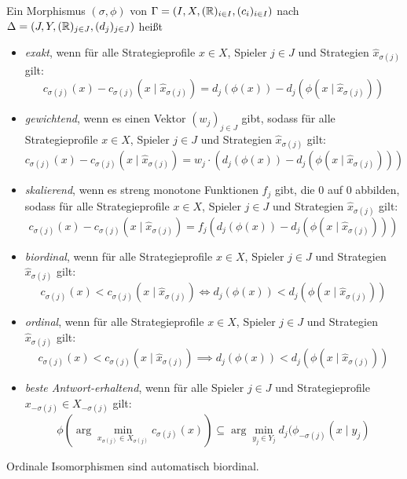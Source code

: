 
\begin{defn}
	Ein Morphismus $(\sigma, \phi)$ von $\Gamma = (I, X, (\mathbb{R})_{i\in I}, (c_i)_{i\in I})$ nach $\Delta = (J, Y, (\mathbb{R})_{j\in J}, (d_j)_{j\in J})$ heißt
	\begin{itemize}
		\item \emph{exakt}, wenn für alle Strategieprofile $x \in X$, Spieler $j \in J$ und Strategien $\hat{x}_{\sigma(j)}$ gilt:
		\[c_{\sigma(j)}(x) - c_{\sigma(j)}(x \mid \hat{x}_{\sigma(j)}) = d_j(\phi(x)) - d_j(\phi(x \mid \hat{x}_{\sigma(j)}))\]
		\item \emph{gewichtend}, wenn es einen Vektor $(w_j)_{j \in J}$ gibt, sodass für alle Strategieprofile $x \in X$, Spieler $j \in J$ und Strategien $\hat{x}_{\sigma(j)}$ gilt:
		\[c_{\sigma(j)}(x) - c_{\sigma(j)}(x \mid \hat{x}_{\sigma(j)}) = w_j\cdot\left(d_j(\phi(x)) - d_j(\phi(x \mid \hat{x}_{\sigma(j)}))\right)\]
		\item \emph{skalierend}, wenn es streng monotone Funktionen $f_j$ gibt, die $0$ auf $0$ abbilden, sodass für alle Strategieprofile $x \in X$, Spieler $j \in J$ und Strategien $\hat{x}_{\sigma(j)}$ gilt:
		\[c_{\sigma(j)}(x) - c_{\sigma(j)}(x \mid \hat{x}_{\sigma(j)}) = f_j(d_j(\phi(x)) - d_j(\phi(x \mid \hat{x}_{\sigma(j)})))\]
		\item \emph{biordinal}, wenn für alle Strategieprofile $x \in X$, Spieler $j \in J$ und Strategien $\hat{x}_{\sigma(j)}$ gilt:
		\[c_{\sigma(j)}(x) < c_{\sigma(j)}(x \mid \hat{x}_{\sigma(j)}) \iff d_j(\phi(x)) < d_j(\phi(x \mid \hat{x}_{\sigma(j)}))\]
		\item \emph{ordinal}, wenn für alle Strategieprofile $x \in X$, Spieler $j \in J$ und Strategien $\hat{x}_{\sigma(j)}$ gilt:
		\[c_{\sigma(j)}(x) < c_{\sigma(j)}(x \mid \hat{x}_{\sigma(j)}) \implies d_j(\phi(x)) < d_j(\phi(x \mid \hat{x}_{\sigma(j)}))\]
		\item \emph{beste Antwort-erhaltend}, wenn für alle Spieler $j \in J$ und Strategieprofile $x_{-\sigma(j)} \in X_{-\sigma(j)}$ gilt:
		\[\phi(\arg \min_{x_{\sigma(j)} \in X_{\sigma(j)}}c_{\sigma(j)}(x)) \subseteq \arg \min_{y_j \in Y_j} d_j(\phi_{-\sigma(j)}(x \mid y_j)\]
	\end{itemize}	
\end{defn}

\begin{beob}
	Ordinale Isomorphismen sind automatisch biordinal.
\end{beob}

